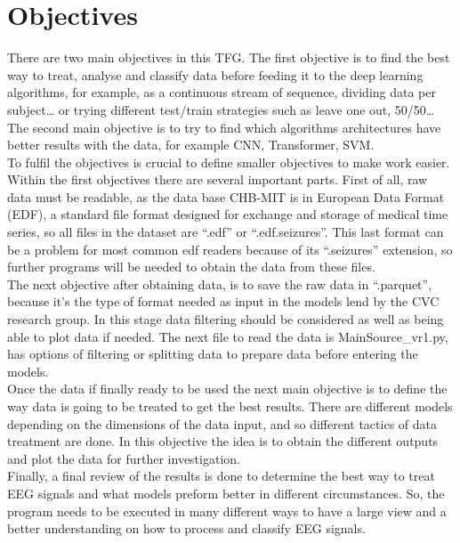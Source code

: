 ﻿\documentclass[10pt,a4paper,twocolumn,twoside]{article}
\begin{document}



\section{Objectives}
\label{sec-objectives}
There are two main objectives in this TFG. The first objective is to find the best way to treat, analyse and classify data before feeding it to the deep learning algorithms, for example, as a continuous stream of sequence, dividing data per subject…  or trying different test/train strategies such as leave one out, 50/50… The second main objective is to try to find which algorithms architectures have better results with the data, for example CNN, Transformer, SVM.
\\
To fulfil the objectives is crucial to define smaller objectives to make work easier. Within the first objectives there are several important parts. First of all, raw data must be readable, as the data base CHB-MIT is in European Data Format (EDF), a standard file format designed for exchange and storage of medical time series, so all files in the dataset are “.edf” or “.edf.seizures”. This last format can be a problem for most common edf readers because of its “.seizures” extension, so further programs will be needed to obtain the data from these files.
\\
The next objective after obtaining data, is to save the raw data in “.parquet”, because it’s the type of format needed as input in the models lend by the CVC research group. In this stage data filtering should be considered as well as being able to plot data if needed. The next file to read the data is MainSource\_vr1.py, has options of filtering or splitting data to prepare data before entering the models. 
\\
Once the data if finally ready to be used the next main objective is to define the way data is going to be treated to get the best results. There are different models depending on the dimensions of the data input, and so different tactics of data treatment are done. In this objective the idea is to obtain the different outputs and plot the data for further investigation.
\\
Finally, a final review of the results is done to determine the best way to treat EEG signals and what models preform better in different circumstances. So, the program needs to be executed in many different ways to have a large view and a better understanding on how to process and classify EEG signals.
\\
\end{document}

